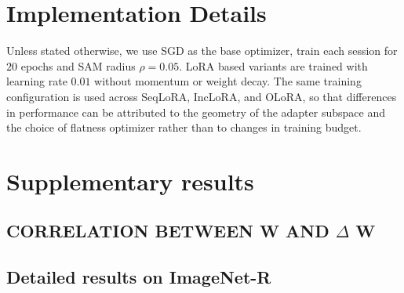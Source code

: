 \documentclass{article}
\theoremstyle{plain}
\theoremstyle{definition}
\theoremstyle{remark}
\begin{document}
\section{Implementation Details}


Unless stated otherwise, we use SGD as the base optimizer, train each session for $20$ epochs and SAM radius $\rho = 0.05$. LoRA based variants are trained with learning rate $0.01$ without momentum or weight decay. The same training configuration is used across SeqLoRA, IncLoRA, and OLoRA, so that differences in performance can be attributed to the geometry of the adapter subspace and the choice of flatness optimizer rather than to changes in training budget.



    
\section{Supplementary results}

\subsection{CORRELATION BETWEEN W AND $\Delta$ W}



\subsection{Detailed results on ImageNet-R}
\end{document}
